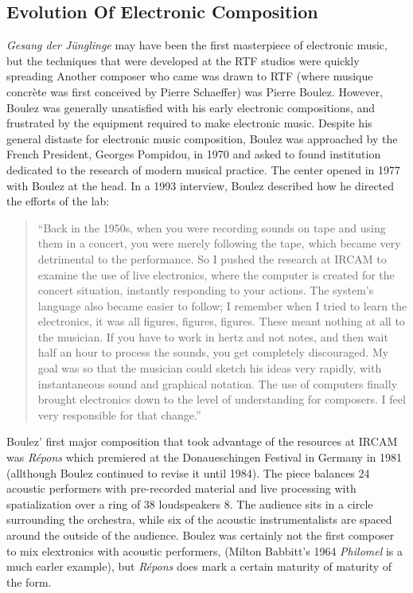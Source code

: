 \subsection{Evolution Of Electronic Composition}
\label{sec:evolution-of-electronic-composition}
\textit{Gesang der J\"{u}nglinge} may have been the first masterpiece
of electronic music, but the techniques that were developed at the RTF
studios were quickly spreading Another composer who came was drawn to
RTF (where musique concr\`{e}te was first conceived by Pierre
Schaeffer) was Pierre Boulez. However, Boulez was generally
unsatisfied with his early electronic compositions, and frustrated by
the equipment required to make electronic music. Despite his general
distaste for electronic music composition, Boulez was approached by
the French President, Georges Pompidou, in 1970 and asked to found
institution dedicated to the research of modern musical practice. The
center opened in 1977 with Boulez at the head. In a 1993 interview,
Boulez described how he directed the efforts of the lab:
\begin{quotation}
  ``Back in the 1950s, when you were recording sounds on tape and using
  them in a concert, you were merely following the tape, which became
  very detrimental to the performance. So I pushed the research at
  IRCAM to examine the use of live electronics, where the computer is
  created for the concert situation, instantly responding to your
  actions. The system's language also became easier to follow; I
  remember when I tried to learn the electronics, it was all figures,
  figures, figures. These meant nothing at all to the musician. If you
  have to work in hertz and not notes, and then wait half an hour to
  process the sounds, you get completely discouraged. My goal was so
  that the musician could sketch his ideas very rapidly, with
  instantaneous sound and graphical notation. The use of computers
  finally brought electronics down to the level of understanding for
  composers. I feel very responsible for that change.''\cite{Carvin1993}
\end{quotation}
Boulez' first major composition that took advantage of the resources
at IRCAM was \textit{R\'{e}pons} which premiered at the Donaueschingen
Festival in Germany in 1981 (allthough Boulez continued to revise it
until 1984). The piece balances 24 acoustic performers with pre-recorded material
and live processing with spatialization over a ring of 38 loudspeakers
8. The audience sits in a circle surrounding the orchestra, while six
of the acoustic instrumentalists are spaced around the outside of the
audience. Boulez was certainly not the first composer to
mix elextronics with acoustic performers, (Milton Babbitt's 1964
\textit{Philomel} is a much earler example), but \textit{R\'{e}pons}
does mark a certain maturity of maturity of the form.

